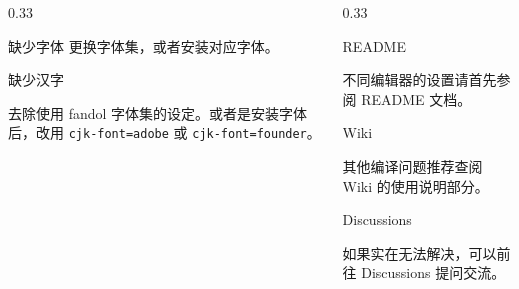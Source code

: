 \begin{frame}[label=compile]
\begin{columns}
\begin{column}{0.33\textwidth}
\begin{alertblock}{缺少字体 }
        更换字体集，或者安装对应字体。

      \end{alertblock}

      \begin{alertblock}{缺少汉字 }

        去除使用 fandol 字体集的设定。或者是安装字体后，改用 \texttt{cjk-font=adobe} 或 \texttt{cjk-font=founder}。

      \end{alertblock}

    \end{column}

    \begin{column}{0.33\textwidth}

      \begin{block}{\faInfoCircle{} README}

        不同编辑器的设置请首先参阅 README  文档。

      \end{block}

      \begin{block}{\faBookOpen{} Wiki}

        其他编译问题推荐查阅 Wiki  的使用说明部分。

      \end{block}

      \begin{block}{\faComments{} Discussions}

        如果实在无法解决，可以前往 Discussions  提问交流。

      \end{block}

    \end{column}

  \end{columns}


\end{frame}

